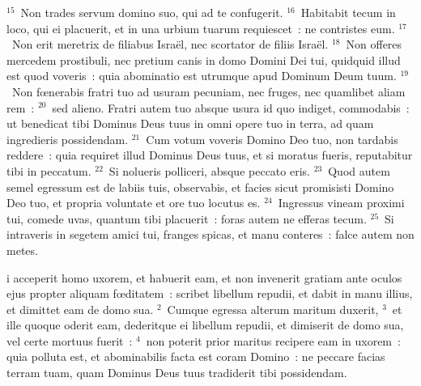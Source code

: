 ${}^{15}$~Non trades servum domino suo, qui ad te confugerit.
${}^{16}$~Habitabit tecum in loco, qui ei placuerit, et in una urbium tuarum requiescet~: ne contristes eum.
${}^{17}$~Non erit meretrix de filiabus Isra\"el, nec scortator de filiis Isra\"el.
${}^{18}$~Non offeres mercedem prostibuli, nec pretium canis in domo Domini Dei tui, quidquid illud est quod voveris~: quia abominatio est utrumque apud Dominum Deum tuum.
${}^{19}$~Non fœnerabis fratri tuo ad usuram pecuniam, nec fruges, nec quamlibet aliam rem~:
${}^{20}$~sed alieno. Fratri autem tuo absque usura id quo indiget, commodabis~: ut benedicat tibi Dominus Deus tuus in omni opere tuo in terra, ad quam ingredieris possidendam.
${}^{21}$~Cum votum voveris Domino Deo tuo, non tardabis reddere~: quia requiret illud Dominus Deus tuus, et si moratus fueris, reputabitur tibi in peccatum.
${}^{22}$~Si nolueris polliceri, absque peccato eris.
${}^{23}$~Quod autem semel egressum est de labiis tuis, observabis, et facies sicut promisisti Domino Deo tuo, et propria voluntate et ore tuo locutus es.
${}^{24}$~Ingressus vineam proximi tui, comede uvas, quantum tibi placuerit~: foras autem ne efferas tecum.
${}^{25}$~Si intraveris in segetem amici tui, franges spicas, et manu conteres~: falce autem non metes.

\bchapter
{}i acceperit homo uxorem, et habuerit eam, et non invenerit gratiam ante oculos ejus propter aliquam fœditatem~: scribet libellum repudii, et dabit in manu illius, et dimittet eam de domo sua.
${}^{2}$~Cumque egressa alterum maritum duxerit,
${}^{3}$~et ille quoque oderit eam, dederitque ei libellum repudii, et dimiserit de domo sua, vel certe mortuus fuerit~:
${}^{4}$~non poterit prior maritus recipere eam in uxorem~: quia polluta est, et abominabilis facta est coram Domino~: ne peccare facias terram tuam, quam Dominus Deus tuus tradiderit tibi possidendam.


